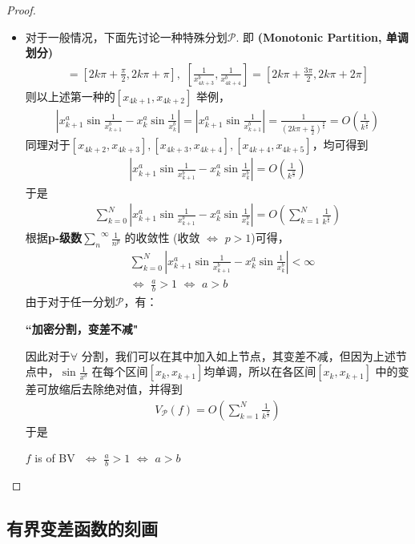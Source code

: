 \begin{example}
\begin{itemize}
\begin{proof}
\begin{itemize}
				\item 对于一般情况，下面先讨论一种特殊分划$\mathcal{P}$. 即 \textbf{(Monotonic Partition, 单调划分)}
				\begin{align}
					[\frac{1}{x_{4k + 1}^b} , \frac{1}{x_{4k + 2}^b}] = [2k\pi + \frac{\pi}{2}, 2k\pi + \pi] , \,\,
					[\frac{1}{x_{4k + 3}^b} , \frac{1}{x_{4k + 4}^b}] = [2k\pi + \frac{3\pi}{2} , 2k\pi + 2\pi]
				\end{align}
				则以上述第一种的$[x_{4k + 1} , x_{4k + 2}]$ 举例，
				\begin{align}
					\left| x_{k + 1}^{a} \sin{\frac{1}{x_{k + 1}^{b}}} - x_{k}^{a} \sin{\frac{1}{x_{k}^{b}}} \right|
					= \left| x_{k + 1}^{a} \sin{\frac{1}{x_{k + 1}^{b}}} \right|
					= \frac{1}{(2k\pi + \frac{\pi}{2})^{\frac{a}{b}}}
					= O(\frac{1}{k^{\frac{a}{b}}})
				\end{align}
				同理对于$[x_{4k + 2} , x_{4k + 3}] , [x_{4k + 3} , x_{4k + 4}]  ,[x_{4k + 4} , x_{4k + 5}]$，均可得到
				\begin{align}
					\left| x_{k + 1}^{a} \sin{\frac{1}{x_{k + 1}^{b}}} - x_{k}^{a} \sin{\frac{1}{x_{k}^{b}}} \right|
					= O(\frac{1}{k^{\frac{a}{b}}})
				\end{align}
				于是
				\begin{align}
					\sum_{k = 0}^{N}{\left| x_{k + 1}^{a} \sin{\frac{1}{x_{k + 1}^{b}}} - x_{k}^{a} \sin{\frac{1}{x_{k}^{b}}} \right|}
					= O\left( \sum_{k = 1}^{N}{\frac{1}{k^{\frac{a}{b}}}} \right)
				\end{align}
				根据\textbf{p-级数}$\overset{\infty}{\underset{n}{\sum}}{\frac{1}{n^p}}$ 的收敛性 (收敛 $\Leftrightarrow$ $p > 1$)可得，
				\begin{align}
					&\sum_{k = 0}^{N}{\left| x_{k + 1}^{a} \sin{\frac{1}{x_{k + 1}^{b}}} - x_{k}^{a} \sin{\frac{1}{x_{k}^{b}}} \right|} < \infty \\
					&\Leftrightarrow \,\, \frac{a}{b} > 1 \,\, \Leftrightarrow \,\, a > b
				\end{align}
				由于对于任一分划$\mathcal{P}$，有：
				\begin{center}
					\textbf{``加密分割，变差不减"}
				\end{center}
				因此对于$\forall$ 分割，我们可以在其中加入如上节点，其变差不减，但因为上述节点中，$\sin{\frac{1}{x^b}}$ 在每个区间$[x_k , x_{k + 1}]$均单调，所以在各区间$[x_k , x_{k + 1}]$ 中的变差可放缩后去除绝对值，并得到
				\begin{align}
					V_{\mathcal{P}}(f) = O\left( \sum_{k = 1}^{N}{\frac{1}{k^{\frac{a}{b}}}} \right)
				\end{align}
				于是
				\begin{center}
					$f$ is of BV $\,\, \Leftrightarrow \,\, \frac{a}{b} > 1 \,\, \Leftrightarrow \,\, a > b$
				\end{center}
				\end{itemize}
			\end{proof}
		\end{itemize}
	\end{example}

\newpage
\subsection{有界变差函数的刻画}
	

	\ifx\allfiles\undefined

\fi